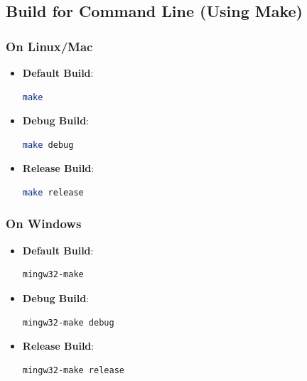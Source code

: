 \documentclass[12pt,a4paper]{report}
\begin{document}
\subsection{Build for Command Line (Using Make)}
\subsubsection{On Linux/Mac}
\begin{itemize}
    \item \normalsize \textbf{Default Build}:
    \begin{lstlisting}[language=Bash, caption=Default Build Using Make on Linux/Mac]
    make
    \end{lstlisting}
    \item \normalsize \textbf{Debug Build}:
    \begin{lstlisting}[language=Bash, caption=Debug Build Using Make on Linux/Mac]
    make debug
    \end{lstlisting}
    \item \normalsize \textbf{Release Build}:
    \begin{lstlisting}[language=Bash, caption=Release Build Using Make on Linux/Mac]
    make release
    \end{lstlisting}
\end{itemize}

\subsubsection{On Windows}
\begin{itemize}
    \item \normalsize \textbf{Default Build}:
    \begin{lstlisting}[language=Bash, caption=Default Build Using Make on Windows]
    mingw32-make
    \end{lstlisting}
    \item \normalsize \textbf{Debug Build}:
    \begin{lstlisting}[language=Bash, caption=Debug Build Using Make on Windows]
    mingw32-make debug
    \end{lstlisting}
    \item \normalsize \textbf{Release Build}:
    \begin{lstlisting}[language=Bash, caption=Release Build Using Make on Windows]
    mingw32-make release
    \end{lstlisting}
\end{itemize}
\end{document}
